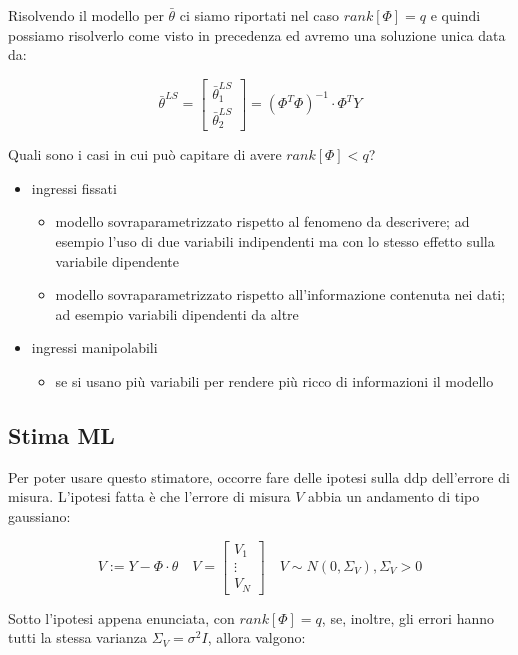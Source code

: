 Risolvendo il modello per $\bar{\theta}$ ci siamo riportati nel caso $rank[\Phi]=q$ e quindi possiamo risolverlo come visto in precedenza ed avremo una soluzione unica data da:

  \[ \bar{\theta}^{LS}=\begin{bmatrix} \bar{\theta}_1^{LS} \\ \bar{\theta}_2^{LS} \end{bmatrix}=(\Phi^T\Phi)^{-1}\cdot \Phi^TY \]
  
Quali sono i casi in cui può capitare di avere $rank[\Phi]<q$?

  \begin{itemize}
    \item ingressi fissati
    \begin{itemize}
      \item modello sovraparametrizzato rispetto al fenomeno da descrivere; ad esempio l'uso di due variabili indipendenti ma con lo stesso effetto sulla variabile dipendente
      \item modello sovraparametrizzato rispetto all'informazione contenuta nei dati; ad esempio variabili dipendenti da altre
    \end{itemize}
    \item ingressi manipolabili
    \begin{itemize}
      \item se si usano più variabili per rendere più ricco di informazioni il modello
    \end{itemize}
  \end{itemize}
  
\subsection{Stima ML}
Per poter usare questo stimatore, occorre fare delle ipotesi sulla ddp dell'errore di misura. L'ipotesi fatta è che l'errore di misura $V$ abbia un andamento di tipo gaussiano:

  \[ V:=Y-\Phi\cdot\theta\quad
    V=\begin{bmatrix} V_1 \\ \vdots \\ V_N  \end{bmatrix}\quad
    V\sim N(0,\Sigma_V) , \Sigma_V>0 
  \]
  
Sotto l'ipotesi appena enunciata, con $rank[\Phi]=q$, se, inoltre, gli errori hanno tutti la stessa varianza $\Sigma_V=\sigma^2I$, allora valgono:

